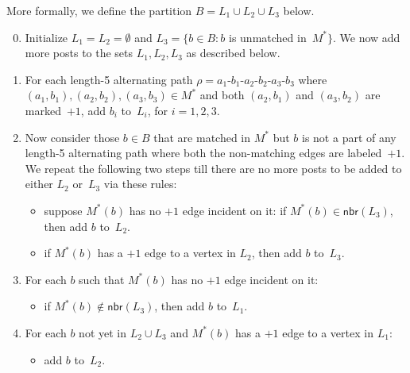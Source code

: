 \documentclass[11pt]{llncs}
\newcommand{\Nbr}{\mathsf{nbr}}
\begin{document}
More formally, we define the partition $B = L_1 \cup L_2 \cup L_3$ below.
\begin{enumerate}\setcounter{enumi}{-1}
\item Initialize $L_1 = L_2 = \emptyset$ and $L_3 = \{b\in B: b$ is unmatched in~$M^*\}$.
We now add more posts to the sets $L_1, L_2, L_3$ as described below.

\item 
For each length-5 alternating path $\rho = a_1$-$b_1$-$a_2$-$b_2$-$a_3$-$b_3$ where 
$(a_1,b_1), (a_2,b_2), (a_3,b_3) \in M^*$ and both $(a_2,b_1)$ and $(a_3,b_2)$ are marked~$+1$, 
add $b_i$ to~$L_i$, for $i = 1,2,3$.

\item Now consider those $b \in B$ that are matched in $M^*$ but $b$ is not a part of any 
length-5 alternating path where both the non-matching edges are labeled~$+1$. We repeat the 
following two steps till there are no more posts to be added to either $L_2$ or~$L_3$
via these rules: 
\begin{itemize}
\item suppose $M^*(b)$ has no $+1$ edge incident on it: if $M^*(b) \in \Nbr(L_3)$, then add 
$b$ to~$L_2$. 
\item if $M^*(b)$ has a $+1$ edge to a vertex in $L_2$, then add $b$ to~$L_3$. 
\end{itemize}
\item For each $b$ such that $M^*(b)$ has no $+1$ edge incident on it: 
\begin{itemize}
\item if $M^*(b) \notin \Nbr(L_3)$, then add $b$ to~$L_1$. 
\end{itemize}
\item For each $b$ not yet in $L_2\cup L_3$ and $M^*(b)$ has a $+1$ edge to a vertex in $L_1$: 
\begin{itemize}
\item add $b$ to~$L_2$. 
\end{itemize}
\end{enumerate}
\end{document}
